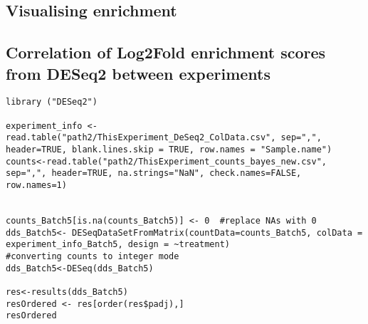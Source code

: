 \subsection{Visualising enrichment}


\subsection{Correlation of Log2Fold enrichment scores from DESeq2 between experiments}

\begin{lstlisting}
library ("DESeq2")

experiment_info <- read.table("path2/ThisExperiment_DeSeq2_ColData.csv", sep=",", header=TRUE, blank.lines.skip = TRUE, row.names = "Sample.name")
counts<-read.table("path2/ThisExperiment_counts_bayes_new.csv", sep=",", header=TRUE, na.strings="NaN", check.names=FALSE, row.names=1)


counts_Batch5[is.na(counts_Batch5)] <- 0  #replace NAs with 0
dds_Batch5<- DESeqDataSetFromMatrix(countData=counts_Batch5, colData = experiment_info_Batch5, design = ~treatment)
#converting counts to integer mode
dds_Batch5<-DESeq(dds_Batch5)

res<-results(dds_Batch5)
resOrdered <- res[order(res$padj),]
resOrdered
\end{lstlisting}







